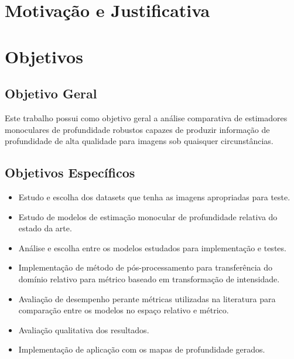 \section{Motivação e Justificativa} 


 
\section{Objetivos}


\subsection{Objetivo Geral}
Este trabalho possui como objetivo geral a análise comparativa de estimadores monoculares de profundidade robustos capazes de produzir informação de profundidade de alta qualidade para imagens sob quaisquer circunstâncias.

\subsection{Objetivos Específicos}

\begin{itemize}
    \item Estudo e escolha dos datasets que tenha as imagens apropriadas para teste.
    \item Estudo de modelos de estimação monocular de profundidade relativa do estado da arte.
    \item Análise e escolha entre os modelos estudados para implementação e testes.
    \item Implementação de método de pós-processamento para transferência do domínio relativo para métrico baseado em transformação de intensidade.
    \item Avaliação de desempenho perante métricas utilizadas na literatura para comparação entre os modelos no espaço relativo e métrico.
    \item Avaliação qualitativa dos resultados.
    \item Implementação de aplicação com os mapas de profundidade gerados.
    
\end{itemize}

